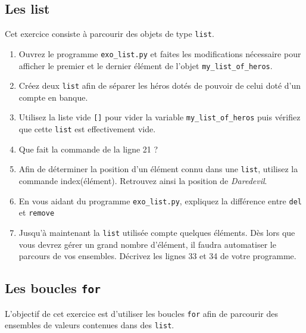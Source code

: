 \subsection{Les list}


Cet exercice consiste à parcourir des objets de type \texttt{list}.

\begin{enumerate}
\item Ouvrez le programme \texttt{exo\_list.py} et faites les modifications nécessaire pour
  afficher le premier et le dernier élément de l'objet \texttt{my\_list\_of\_heros}.
\item Créez deux \texttt{list} afin de séparer les héros dotés de pouvoir de
  celui doté d'un compte en banque.
\item Utilisez la liste vide \texttt{[]} pour vider la variable \texttt{my\_list\_of\_heros} puis vérifiez que cette
  \texttt{list} est effectivement vide.
\item Que fait la commande de la ligne 21 ?
\item Afin de déterminer la position d'un élément connu dans une \texttt{list}, utilisez la commande index(élément).
  Retrouvez ainsi la position de \textit{Daredevil}.

\item En vous aidant du programme \texttt{exo\_list.py}, expliquez la différence entre \texttt{del} et \texttt{remove}

\item Jusqu'à maintenant la \texttt{list} utilisée compte quelques éléments. Dès lors
  que vous devrez gérer un grand nombre d'élément, il faudra automatiser le parcours de vos ensembles.
  Décrivez les lignes 33 et 34 de votre programme.





\end{enumerate}



\subsection{Les boucles \texttt{for}}

L'objectif de cet exercice est d'utiliser les boucles \texttt{for} afin de
parcourir des ensembles de valeurs contenues dans des \texttt{list}.



